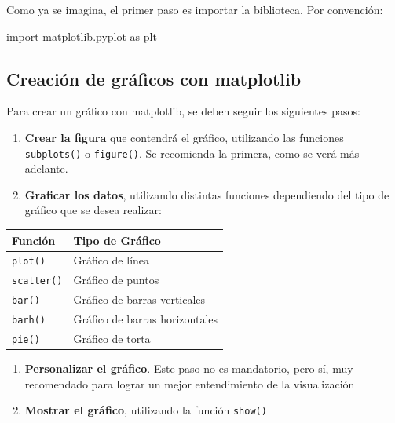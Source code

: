 \documentclass[
  letterpaper,
  DIV=11,
  numbers=noendperiod]{scrreprt}
\newenvironment{Shaded}{\begin{snugshade}}{\end{snugshade}}
\newcommand{\ImportTok}[1]{\textcolor[rgb]{0.00,0.46,0.62}{#1}}
\newcommand{\NormalTok}[1]{\textcolor[rgb]{0.00,0.23,0.31}{#1}}
\begin{document}
Como ya se imagina, el primer paso es importar la biblioteca. Por
convención:

\begin{Shaded}
\begin{Highlighting}[]
\ImportTok{import}\NormalTok{ matplotlib.pyplot }\ImportTok{as}\NormalTok{ plt}
\end{Highlighting}
\end{Shaded}

\subsection{Creación de gráficos con
matplotlib}\label{creaciuxf3n-de-gruxe1ficos-con-matplotlib}

Para crear un gráfico con matplotlib, se deben seguir los siguientes
pasos:

\begin{enumerate}
\def\labelenumi{\arabic{enumi}.}
\item
  \textbf{Crear la figura} que contendrá el gráfico, utilizando las
  funciones \texttt{subplots()} o \texttt{figure()}. Se recomienda la
  primera, como se verá más adelante.
\item
  \textbf{Graficar los datos}, utilizando distintas funciones
  dependiendo del tipo de gráfico que se desea realizar:
\end{enumerate}

\begin{longtable}[]{@{}ll@{}}
\toprule\noalign{}
Función & Tipo de Gráfico \\
\midrule\noalign{}
\endhead
\bottomrule\noalign{}
\endlastfoot
\texttt{plot()} & Gráfico de línea \\
\texttt{scatter()} & Gráfico de puntos \\
\texttt{bar()} & Gráfico de barras verticales \\
\texttt{barh()} & Gráfico de barras horizontales \\
\texttt{pie()} & Gráfico de torta \\
\end{longtable}

\begin{enumerate}
\def\labelenumi{\arabic{enumi}.}
\setcounter{enumi}{2}
\item
  \textbf{Personalizar el gráfico}. Este paso no es mandatorio, pero sí,
  muy recomendado para lograr un mejor entendimiento de la visualización
\item
  \textbf{Mostrar el gráfico}, utilizando la función \texttt{show()}
\end{enumerate}
\end{document}

